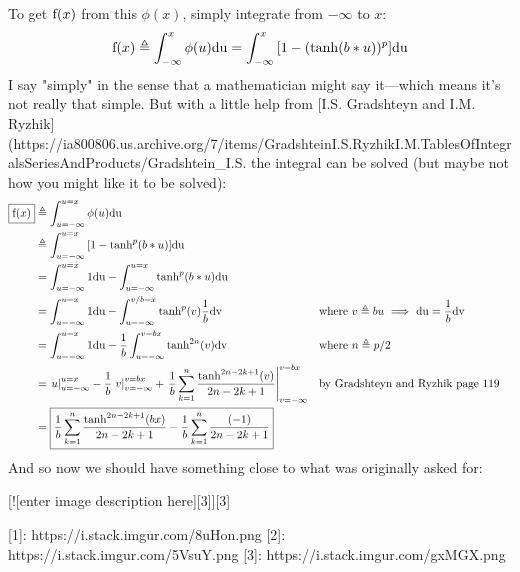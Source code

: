 To get $\mathrm{f}(x)$ from this $\phi(x)$, simply integrate from $-\infty$ to $x$:
$$\mathrm{f}(x)\triangleq \int_{-\infty}^x \phi(u)\mathrm{du} = \int_{-\infty}^x {\left[1 - (\tanh(b*u))^p\right]}\mathrm{du}$$
I say "simply" in the sense that a mathematician might say it---which means it's not really that simple.
But with a little help from [I.S. Gradshteyn and I.M. Ryzhik](https://ia800806.us.archive.org/7/items/GradshteinI.S.RyzhikI.M.TablesOfIntegralsSeriesAndProducts/Gradshtein_I.S.%
the integral can be solved (but maybe not how you might like it to be solved):
\begin{align}
  \boxed{\mathrm{f}(x)}
    &\triangleq \int_{u=-\infty}^{u=x} \phi(u)\mathrm{du} 
  \\&\triangleq \int_{u=-\infty}^{u=x} {\left[1 - \tanh^p(b*u)\right]}\mathrm{du}
  \\&= \int_{u=-\infty}^{u=x}1\mathrm{du} - \int_{u=-\infty}^{u=x} \tanh^p(b*u)\mathrm{du}
  \\&= \int_{u=-\infty}^{u=x}1\mathrm{du} - \int_{u=-\infty}^{v/b=x} \tanh^p(v)\frac{1}{b}\mathrm{dv}
    && \text{where $v\triangleq bu$ $\implies$ $\mathrm{du} = \frac{1}{b}\mathrm{dv}$}
  \\&= \int_{u=-\infty}^{u=x}1\mathrm{du} - \frac{1}{b}\int_{u=-\infty}^{v=bx} \tanh^{2n}(v) \mathrm{dv}
    && \text{where $n\triangleq p/2$}
  \\&= \left.u\right|_{u=-\infty}^{u=x} 
     - \frac{1}{b}\left.v\right|_{v=-\infty}^{v=bx} 
     + \left.\frac{1}{b}\sum_{k=1}^n \frac{\tanh^{2n-2k+1}(v)}{2n-2k+1}\right|_{v=-\infty}^{v=bx}
    && \text{by Gradshteyn and Ryzhik page 119}
  \\&= \boxed{\frac{1}{b}\sum_{k=1}^n \frac{\tanh^{2n-2k+1}(bx)}{2n-2k+1}
     - \frac{1}{b}\sum_{k=1}^n \frac{(-1)}{2n-2k+1}}
\end{align}
And so now we should have something close to what was originally asked for:

[![enter image description here][3]][3]

  [1]: https://i.stack.imgur.com/8uHon.png
  [2]: https://i.stack.imgur.com/5VsuY.png
  [3]: https://i.stack.imgur.com/gxMGX.png
